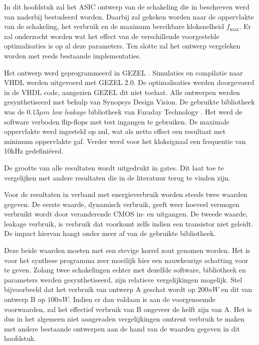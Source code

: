 
In dit hoofdstuk zal het ASIC ontwerp van de schakeling die in  beschreven werd van naderbij bestudeerd worden. Daarbij zal gekeken worden naar de oppervlakte van de schakeling, het verbruik en de maximum bereikbare kloksnelheid $f_{\text{max}}$. Er zal onderzocht worden wat het effect van de verschillende voorgestelde optimalisaties is op al deze parameters. Ten slotte zal het ontwerp vergeleken worden met reeds bestaande implementaties.

Het ontwerp werd geprogrammeerd in GEZEL \cite{gezel}. Simulaties en compilatie naar VHDL werden uitgevoerd met GEZEL 2.0. De optimalisaties werden doorgevoerd in de VHDL code, aangezien GEZEL dit niet toelaat. Alle ontwerpen werden gesynthetiseerd met behulp van Synopsys Design Vision. De gebruikte bibliotheek was de \emph{$0.13 \mu m$ low leakage} bibliotheek van Faraday Technology \cite{cell-databook}. Het werd de software verboden flip-flops met test ingangen te gebruiken. De maximale oppervlakte werd ingesteld op nul, wat als netto effect een resultaat met minimum oppervlakte gaf. Verder werd voor het kloksignaal een frequentie van 10kHz gedefini\"eerd.

De grootte van alle resultaten wordt uitgedrukt in gates. Dit laat toe te vergelijken met andere resultaten die in de literatuur terug te vinden zijn.

Voor de resultaten in verband met energieverbruik worden steeds twee waarden gegeven. De eerste waarde, dynamisch verbruik, geeft weer hoeveel vermogen verbruikt wordt door veranderende CMOS in- en uitgangen. De tweede waarde, leakage verbruik, is verbruik dat voorkomt zelfs indien een transistor niet geleidt. De impact hiervan hangt onder meer af van de gebruikte bibliotheek.

Deze beide waarden moeten met een stevige korrel zout genomen worden. Het is voor het synthese programma zeer moeilijk hier een nauwkeurige schatting voor te geven. Zolang twee schakelingen echter met dezelfde software, bibliotheek en parameters werden gesynthetiseerd, zijn relatieve vergelijkingen mogelijk. Stel bijvoorbeeld dat het verbruik van ontwerp A geschat wordt op $200 nW$ en dit van ontwerp B op $100 nW$. Indien er dan voldaan is aan de voorgenoemde voorwaarden, zal het effectief verbruik van B ongeveer de helft zijn van A. Het is dus in het algemeen niet aangeraden vergelijkingen omtrent verbruik te maken met andere bestaande ontwerpen aan de hand van de waarden gegeven in dit hoofdstuk.

